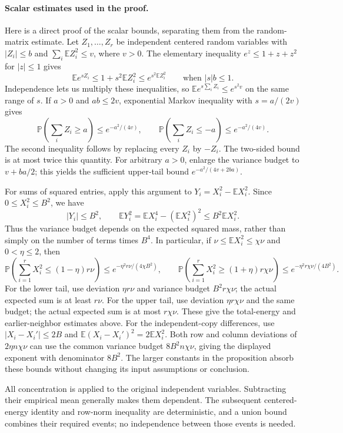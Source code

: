 \documentclass[11pt,a4paper]{article}
\theoremstyle{definition}
\theoremstyle{remark}
\newcommand{\E}{\mathbb E}
\newcommand{\Prb}{\mathbb P}
\begin{document}
\paragraph{Scalar estimates used in the proof.}
Here is a direct proof of the scalar bounds, separating them from the
random-matrix estimate. Let $Z_1,\ldots,Z_r$ be independent centered random
variables with $|Z_i|\le b$ and $\sum_i\E Z_i^2\le v$, where $v>0$.
The elementary inequality $e^z\le1+z+z^2$ for $|z|\le1$ gives
\[
 \E e^{sZ_i}\le1+s^2\E Z_i^2\le e^{s^2\E Z_i^2}
 \qquad\text{when }|s|b\le1.
\]
Independence lets us multiply these inequalities, so
$\E e^{s\sum_iZ_i}\le e^{s^2v}$ on the same range of $s$.
If $a>0$ and $ab\le2v$, exponential Markov inequality with
$s=a/(2v)$ gives
\[
 \Prb\!\left(\sum_iZ_i\ge a\right)\le e^{-a^2/(4v)},\qquad
 \Prb\!\left(\sum_iZ_i\le-a\right)\le e^{-a^2/(4v)}.
\]
The second inequality follows by replacing every $Z_i$ by $-Z_i$.
The two-sided bound is at most twice this quantity. For arbitrary $a>0$,
enlarge the variance budget to $v+ba/2$; this yields the sufficient
upper-tail bound $e^{-a^2/(4v+2ba)}$.

For sums of squared entries, apply this argument to
$Y_i=X_i^2-\E X_i^2$. Since $0\le X_i^2\le B^2$, we have
\[
 |Y_i|\le B^2,\qquad
 \E Y_i^2=\E X_i^4-(\E X_i^2)^2\le B^2\E X_i^2.
\]
Thus the variance budget depends on the expected squared mass, rather
than simply on the number of terms times $B^4$. In particular, if
$\nu\le\E X_i^2\le\chi\nu$ and $0<\eta\le2$, then
\[
 \Prb\!\left(\sum_{i=1}^rX_i^2\le(1-\eta)r\nu\right)
 \le e^{-\eta^2r\nu/(4\chi B^2)},\qquad
 \Prb\!\left(\sum_{i=1}^rX_i^2\ge(1+\eta)r\chi\nu\right)
 \le e^{-\eta^2r\chi\nu/(4B^2)}.
\]
For the lower tail, use deviation $\eta r\nu$ and variance budget
$B^2r\chi\nu$; the actual expected sum is at least $r\nu$.
For the upper tail, use deviation $\eta r\chi\nu$ and the same budget;
the actual expected sum is at most $r\chi\nu$.
These give the total-energy and earlier-neighbor estimates above.
For the independent-copy differences, use
$|X_i-X_i'|\le2B$ and $\E(X_i-X_i')^2=2\E X_i^2$.
Both row and column deviations of $2\eta n\chi\nu$ can use the common
variance budget $8B^2n\chi\nu$, giving the displayed exponent with
denominator $8B^2$. The larger constants in the proposition absorb these
bounds without changing its input assumptions or conclusion.

All concentration is applied to the original independent variables.
Subtracting their empirical mean generally makes them dependent. The
subsequent centered-energy identity and row-norm inequality are
deterministic, and a union bound combines their required events; no
independence between those events is needed.
\end{document}
